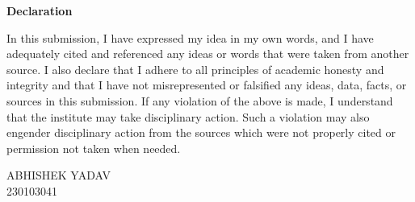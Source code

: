 \documentclass[a4paper, 11pt, oneside]{report}
\begin{document}
\begin{center}
   { \LARGE \textbf{Declaration}}
\end{center}
In this submission, I have expressed my idea in my own words, and I have adequately cited and referenced any ideas or words that were taken from another source. I also declare that I adhere to all principles of academic honesty and integrity and that I have not misrepresented or falsified any ideas, data, facts, or sources in this submission. If any violation of the above is made, I understand that the institute may take disciplinary action. Such a violation may also engender disciplinary action from the sources which were not properly cited or permission not taken when needed.

\vspace{1cm}\hspace{8.35cm} ABHISHEK YADAV \\
\vspace{1cm}\hspace{9cm} 230103041 \\

\newpage
\end{document}
